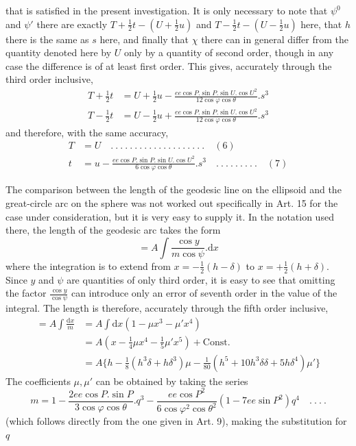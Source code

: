 %
that is satisfied in the present investigation. It is only necessary to note that \(\psi^0\) and \(\psi'\) there are exactly \(T+\frac12t-(U+\frac12u)\) and \(T-\frac12t-(U-\frac12u)\) here, that \(h\) there is the same as \(s\) here, and finally that \(\chi\) there can in general differ from the quantity denoted here by \(U\) only by a quantity of second order, though in any case the difference is of at least first order. This gives, accurately through the third order inclusive,
\[
\begin{aligned}
T+\tfrac12t&=U+\tfrac12u-\frac{ee\cos P\mathord{.}\sin P\mathord{.}\sin U\mathord{.}\cos U^2}{12\cos\varphi\cos\theta}\mathord{.}s^3\\
T-\tfrac12t&=U-\tfrac12u+\frac{ee\cos P\mathord{.}\sin P\mathord{.}\sin U\mathord{.}\cos U^2}{12\cos\varphi\cos\theta}\mathord{.}s^3
\end{aligned}
\]
and therefore, with the same accuracy,
\[
\begin{aligned}
T&=U\quad .\ .\ .\ .\ .\ .\ .\ .\ .\ .\ .\ .\ .\ .\ .\ .\ .\ .\ .\ .\quad(6)\\
t&=u-\frac{ee\cos P\mathord{.}\sin P\mathord{.}\sin U\mathord{.}\cos U^2}{6\cos\varphi\cos\theta}\mathord{.}s^3\quad .\ .\ .\ .\ .\ .\ .\ .\ .\quad(7)
\end{aligned}
\]

\indent The comparison between the length of the geodesic line on the ellipsoid and the great-circle arc on the sphere was not worked out specifically in Art. 15 for the case under consideration, but it is very easy to supply it. In the notation used there, the length of the geodesic arc takes the form
\[
=A\int\frac{\cos y}{m\cos\psi}\mathord{.}\mathrm{d}x
\]
where the integration is to extend from \(x=-\frac12(h-\delta)\) to \(x=+\frac12(h+\delta)\). Since \(y\) and \(\psi\) are quantities of only third order, it is easy to see that omitting the factor \(\frac{\cos y}{\cos\psi}\) can introduce only an error of seventh order in the value of the integral. The length is therefore, accurately through the fifth order inclusive,
\[
\begin{aligned}
=A\int\frac{\mathrm{d}x}{m}&=A\int\mathrm{d}x(1-\mu x^3-\mu'x^4)\\
&=A(x-\tfrac14\mu x^4-\tfrac15\mu'x^5)+\text{Const.}\\
&=A\{h-\tfrac18(h^3\delta+h\delta^3)\mu-\tfrac1{80}(h^5+10h^3\delta\delta+5h\delta^4)\mu'\}
\end{aligned}
\]
The coefficients \(\mu,\mu'\) can be obtained by taking the series
\[
m=1-\frac{2ee\cos P\mathord{.}\sin P}{3\cos\varphi\cos\theta}\mathord{.}q^3-\frac{ee\cos P^2}{6\cos\varphi^2\cos\theta^2}(1-7ee\sin P^2)q^4\quad .\ .\ .\ .
\]
(which follows directly from the one given in Art. 9), making the substitution for \(q\)
